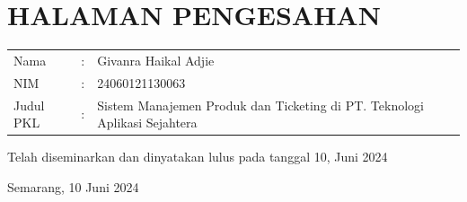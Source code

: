 \documentclass[12pt]{article}
\begin{document}
\section*{HALAMAN PENGESAHAN}

\noindent
\begin{tabularx}{\linewidth}{ p{2cm} l X}
    Nama & : & Givanra Haikal Adjie\\
    NIM & : & 24060121130063 \\ 
    Judul PKL & : & Sistem Manajemen Produk dan Ticketing di PT. Teknologi Aplikasi Sejahtera \\

\end{tabularx}

\vspace*{10pt}
\noindent Telah diseminarkan dan dinyatakan lulus pada tanggal 10, Juni 2024
\vspace*{40pt}

\begin{flushright}
    Semarang, 10 Juni 2024
\end{flushright}
\end{document}

